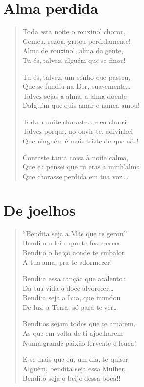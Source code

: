 \chapter{Alma perdida}

\begin{verse}
Toda esta noite o rouxinol chorou,\\
Gemeu, rezou, gritou perdidamente!\\
Alma de rouxinol, alma da gente,\\
Tu és, talvez, alguém que se finou!

Tu és, talvez, um sonho que passou,\\
Que se fundiu na Dor, suavemente\ldots{}\\
Talvez sejas a alma, a alma doente\\
Dalguém que quis amar e nunca amou!

Toda a noite choraste\ldots{} e eu chorei\\
Talvez porque, ao ouvir-te, adivinhei\\
Que ninguém é mais triste do que nós!

Contaste tanta coisa à noite calma,\\
Que eu pensei que tu eras a minh’alma\\
Que chorasse perdida em tua voz!\ldots{} 
\end{verse}

\chapter{De joelhos}

\begin{verse}
“Bendita seja a Mãe que te gerou.”\\
Bendito o leite que te fez crescer\\
Bendito o berço aonde te embalou\\
A tua ama, pra te adormecer!

Bendita essa canção que acalentou\\
Da tua vida o doce alvorecer\ldots{}\\
Bendita seja a Lua, que inundou\\
De luz, a Terra, só para te ver\ldots{}

Benditos sejam todos que te amarem,\\
As que em volta de ti ajoelharem\\
Numa grande paixão fervente e louca!

E se mais que eu, um dia, te quiser\\
Alguém, bendita seja essa Mulher,\\
Bendito seja o beijo dessa boca!!
\end{verse}

